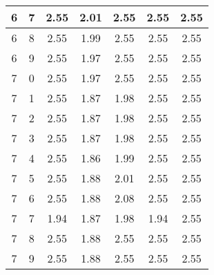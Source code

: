 \begin{longtable}{|c|c||c||c|c||c|c|}
	6 & 7 & 2.55 & 2.01 & 2.55 & 2.55 & 2.55 \\ \hline
	6 & 8 & 2.55 & 1.99 & 2.55 & 2.55 & 2.55 \\ \hline
	6 & 9 & 2.55 & 1.97 & 2.55 & 2.55 & 2.55 \\ \hline
	7 & 0 & 2.55 & 1.97 & 2.55 & 2.55 & 2.55 \\ \hline
	7 & 1 & 2.55 & 1.87 & 1.98 & 2.55 & 2.55 \\ \hline
	7 & 2 & 2.55 & 1.87 & 1.98 & 2.55 & 2.55 \\ \hline
	7 & 3 & 2.55 & 1.87 & 1.98 & 2.55 & 2.55 \\ \hline
	7 & 4 & 2.55 & 1.86 & 1.99 & 2.55 & 2.55 \\ \hline
	7 & 5 & 2.55 & 1.88 & 2.01 & 2.55 & 2.55 \\ \hline
	7 & 6 & 2.55 & 1.88 & 2.08 & 2.55 & 2.55 \\ \hline
	7 & 7 & 1.94 & 1.87 & 1.98 & 1.94 & 2.55 \\ \hline
	7 & 8 & 2.55 & 1.88 & 2.55 & 2.55 & 2.55 \\ \hline
	7 & 9 & 2.55 & 1.88 & 2.55 & 2.55 & 2.55 \\ \hline
\end{longtable}
\clearpage{}
